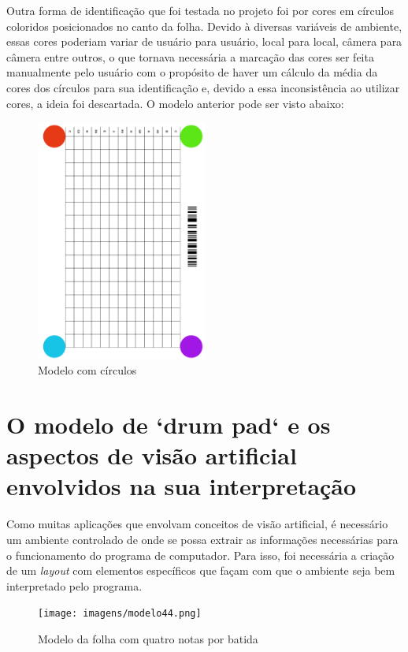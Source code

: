 \documentclass[12pt]{report}
\begin{document}
{Outra forma de identificação que foi testada no projeto foi por cores em círculos coloridos posicionados no canto da folha. Devido à diversas variáveis de ambiente, essas cores poderiam variar de usuário para usuário, local para local, câmera para câmera entre outros, o que tornava necessária a marcação das cores ser feita manualmente pelo usuário com o propósito de haver um cálculo da média da cores dos círculos para sua identificação e, devido a essa inconsistência ao utilizar cores, a ideia foi descartada. O modelo anterior pode ser visto abaixo:

\begin{figure}[H]
  \centering
    \includegraphics[angle=90,origin=c,width=0.5\textwidth]{imagens/circulos.png}
    \caption{Modelo com círculos}
  \label{fig:circulos}
\end{figure}



\chapter{O modelo de `drum pad` e os aspectos de visão artificial
  envolvidos na sua interpretação}
\label{cha:cha1}

Como muitas aplicações que envolvam conceitos de visão artificial, é
necessário um ambiente controlado de onde se possa extrair as
informações necessárias para o funcionamento do programa de
computador. Para isso, foi necessária a criação de um {\it layout} com
elementos específicos que façam com que o ambiente seja bem
interpretado pelo programa.

\begin{figure}[H]
  \centering
    \texttt{[image: imagens/modelo44.png]}
    \caption{Modelo da folha com quatro notas por batida}
  \label{fig:circulos}
\end{figure}

}
\end{document}

